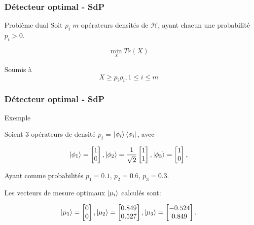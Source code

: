\documentclass{beamer}
\begin{document}
\begin{frame}
    \frametitle{Détecteur optimal - SdP}

    \begin{block}{Problème dual}
        Soit ${\rho_i}$ $m$ opérateurs densités de $\mathcal{H}$, ayant chacun une probabilité $p_i > 0$.

        \begin{equation}
            \min\limits_{X} Tr(X)
        \end{equation}

        Soumis à 
        \begin{equation*}
            X \geq p_i\rho_i, 1 \leq i \leq m
        \end{equation*}
    \end{block}
\end{frame}

\begin{frame}
    \frametitle{Détecteur optimal - SdP}

    \begin{block}{Exemple}

        Soient 3 opérateurs de densité $\rho_i$ = $\ket{\phi_i}\bra{\phi_i}$, avec 

        \begin{equation*}
            \ket{\phi_1} = \begin{bmatrix} 1 \\0\end{bmatrix} , \ket{\phi_2} = \frac{1}{\sqrt{2}} \begin{bmatrix} 1 \\ 1 \end{bmatrix} , \ket{\phi_3} = \begin{bmatrix}1 \\ 0 \end{bmatrix},
        \end{equation*}

        Ayant comme probabilités $p_1 = 0.1$, $p_2 = 0.6$, $p_3 = 0.3$.

        \medbreak

        Les vecteurs de mesure optimaux $\ket{\mu_i}$ calculés sont:

        \begin{equation*}
            \ket{\mu_1} = \begin{bmatrix} 0 \\0 \end{bmatrix} , \ket{\mu_2} = \begin{bmatrix} 0.849 \\ 0.527 \end{bmatrix} , \ket{\mu_3} = \begin{bmatrix} -0.524 \\ 0.849 \end{bmatrix}.
        \end{equation*}
        
    \end{block}
\end{frame}
\end{document}
